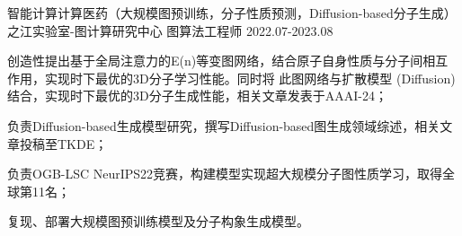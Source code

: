 \begin{cventries}
  \cventry
  {智能计算计算医药（大规模图预训练，分子性质预测，Diffusion-based分子生成）} %
  {之江实验室-图计算研究中心} %
  {图算法工程师} %
  {2022.07-2023.08} %
  {
    \begin{cvitems} %
      \item {创造性提出基于全局注意力的E(n)等变图网络，结合原子自身性质与分子间相互作用，实现时下最优的3D分子学习性能。同时将
      此图网络与扩散模型 (Diffusion) 结合，实现时下最优的3D分子生成性能，相关文章发表于AAAI-24；}
      \item {负责Diffusion-based生成模型研究，撰写Diffusion-based图生成领域综述，相关文章投稿至TKDE；}
      \item {负责OGB-LSC NeurIPS22竞赛，构建模型实现超大规模分子图性质学习，取得全球第11名；}
      \item {复现、部署大规模图预训练模型及分子构象生成模型。}
    \end{cvitems}
  }
\end{cventries}